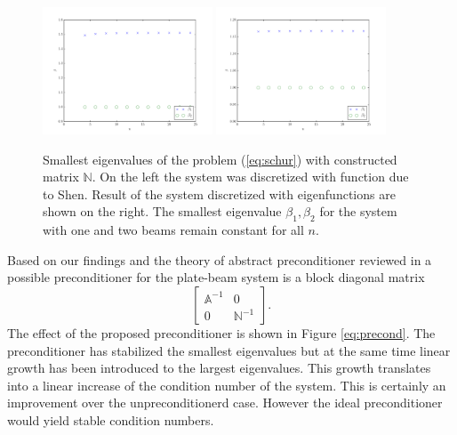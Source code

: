 \documentclass{marine_2015}
\begin{document}
 \begin{figure}[ht]
 \centering
 \includegraphics[width=0.45\textwidth]{img/Schur_precond_shen_cond}
 \includegraphics[width=0.45\textwidth]{img/Schur_precond_sine_cond}\\
 \caption{Smallest eigenvalues of the problem (\ref{eq:schur}) with constructed
 matrix $\mathbb{N}$. On the left the system was discretized with function due
 to Shen. Result of the system discretized with eigenfunctions are shown on the
 right. The smallest eigenvalue $\beta_1, \beta_2$ for the system with one and
 two beams remain constant for all $n$.}
 \label{fig:Schur}
 \end{figure}
Based on our findings and the theory of abstract preconditioner reviewed in
\cite{kent} a possible preconditioner for the plate-beam system is a block
diagonal matrix
\[
    \begin{bmatrix}
      \mathbb{A}^{-1} & 0 \\
      0 & \mathbb{N}^{-1}
    \end{bmatrix}.
\]
The effect of the proposed preconditioner is shown in Figure \ref{eq:precond}.
The preconditioner has stabilized the smallest eigenvalues but at the same time 
linear growth has been introduced to the largest eigenvalues. This growth translates 
into a linear increase of the condition number of the system. This is certainly an 
improvement over the unpreconditionerd case. However the ideal preconditioner
would yield stable condition numbers.
\end{document}
